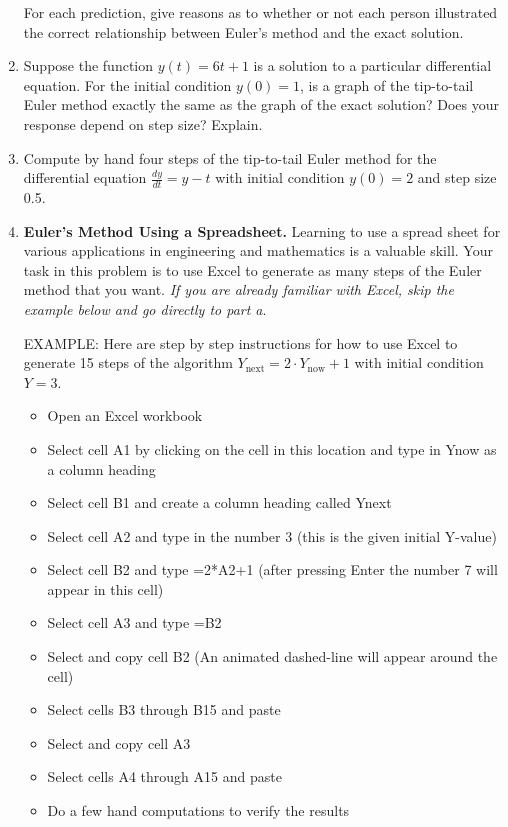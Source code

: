 \begin{enumerate}
For each prediction, give reasons as to whether or not each person illustrated the correct relationship between Euler's method and the exact solution. 

\item Suppose the function $y(t) = 6t +1$ is a solution to a particular differential equation. For the initial condition $y(0) = 1$, is a graph of the tip-to-tail Euler method exactly the same as the graph of the exact solution? Does your response depend on step size? Explain. \label{02HWproblem4}



\item Compute by hand four steps of the tip-to-tail Euler method for the differential equation $\displaystyle\frac{dy}{dt}=y-t$  with initial condition $y(0) = 2$ and step size 0.5. \label{02HWproblem5}

\newpage

\item \textbf{Euler's Method Using a Spreadsheet.} Learning to use a spread sheet for various applications in engineering and mathematics is a valuable skill. Your task in this problem is to use Excel to generate as many steps of the Euler method that you want. \textit{If you are already familiar with Excel, skip the example below and go directly to part a}. \label{02HWproblem6}

EXAMPLE:  Here are step by step instructions for how to use Excel to generate 15 steps of the algorithm   $Y_{\textrm{next}} = 2 \cdot Y_{\textrm{now}} + 1$ with initial condition $Y = 3$. 

\begin{itemize}
\item	Open an Excel workbook 
\item	Select cell A1 by clicking on the cell in this location and type in Ynow as a column heading
\item	Select cell B1 and create a column heading called Ynext
\item	Select cell A2 and type in the number 3 (this is the given initial Y-value)
\item	Select cell B2 and type =2*A2+1 (after pressing Enter the number 7 will appear in this cell)
\item	Select cell A3 and type =B2
\item	Select and copy cell B2  (An animated dashed-line will appear around the cell)
\item	Select cells B3 through B15 and paste 
\item	Select and copy cell A3
\item	Select cells A4 through A15 and paste
\item	Do a few hand computations to verify the results


\end{itemize}
\end{enumerate}
